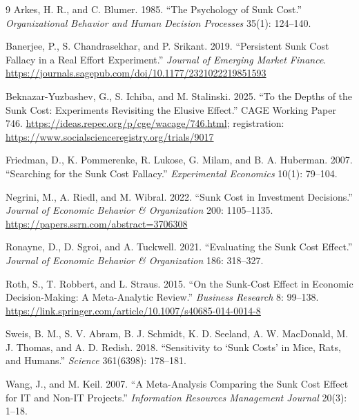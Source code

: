 \documentclass[11pt]{article}
\begin{document}
\begin{thebibliography}{9}
Arkes, H. R., and C. Blumer. 1985. ``The Psychology of Sunk Cost.'' \emph{Organizational Behavior and Human Decision Processes} 35(1): 124--140.

Banerjee, P., S. Chandrasekhar, and P. Srikant. 2019. ``Persistent Sunk Cost Fallacy in a Real Effort Experiment.'' \emph{Journal of Emerging Market Finance}. \url{https://journals.sagepub.com/doi/10.1177/2321022219851593}

Beknazar-Yuzbashev, G., S. Ichiba, and M. Stalinski. 2025. ``To the Depths of the Sunk Cost: Experiments Revisiting the Elusive Effect.'' CAGE Working Paper 746. \url{https://ideas.repec.org/p/cge/wacage/746.html}; registration: \url{https://www.socialscienceregistry.org/trials/9017}

Friedman, D., K. Pommerenke, R. Lukose, G. Milam, and B. A. Huberman. 2007. ``Searching for the Sunk Cost Fallacy.'' \emph{Experimental Economics} 10(1): 79--104.

Negrini, M., A. Riedl, and M. Wibral. 2022. ``Sunk Cost in Investment Decisions.'' \emph{Journal of Economic Behavior \& Organization} 200: 1105--1135. \url{https://papers.ssrn.com/abstract=3706308}

Ronayne, D., D. Sgroi, and A. Tuckwell. 2021. ``Evaluating the Sunk Cost Effect.'' \emph{Journal of Economic Behavior \& Organization} 186: 318--327.

Roth, S., T. Robbert, and L. Straus. 2015. ``On the Sunk-Cost Effect in Economic Decision-Making: A Meta-Analytic Review.'' \emph{Business Research} 8: 99--138. \url{https://link.springer.com/article/10.1007/s40685-014-0014-8}

Sweis, B. M., S. V. Abram, B. J. Schmidt, K. D. Seeland, A. W. MacDonald, M. J. Thomas, and A. D. Redish. 2018. ``Sensitivity to `Sunk Costs' in Mice, Rats, and Humans.'' \emph{Science} 361(6398): 178--181.

Wang, J., and M. Keil. 2007. ``A Meta-Analysis Comparing the Sunk Cost Effect for IT and Non-IT Projects.'' \emph{Information Resources Management Journal} 20(3): 1--18.
\end{thebibliography}
\end{document}
